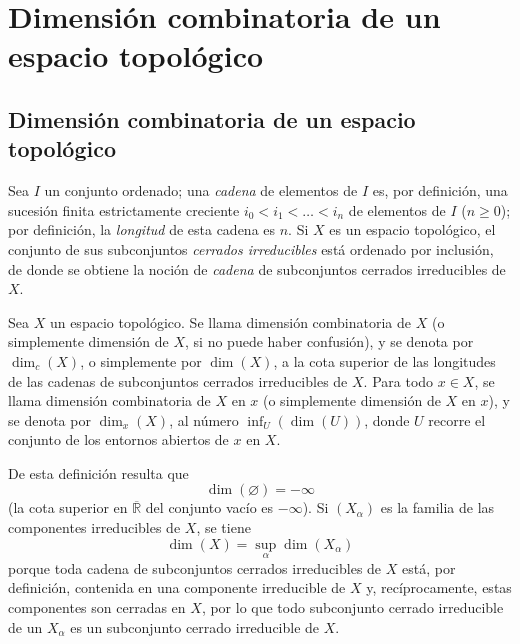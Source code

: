 \setcounter{section}{13}
\section{Dimensión combinatoria de un espacio topológico}
\label{section:0.14-es}

\setcounter{subsection}{0}
\subsection{Dimensión combinatoria de un espacio topológico}
\label{subsection:0.14.1-es}

\begin{env}[14.1.1]
\label{0.14.1.1-es}
Sea $I$ un conjunto ordenado; una \emph{cadena} de elementos de $I$ es, por
definición, una sucesión finita estrictamente creciente
$i_0<i_1<\ldots<i_n$ de elementos de $I$ ($n\geq 0$); por definición, la
\emph{longitud} de esta cadena es $n$. Si $X$ es un espacio topológico, el
conjunto de sus subconjuntos \emph{cerrados irreducibles} está ordenado por
inclusión, de donde se obtiene la noción de \emph{cadena} de subconjuntos
cerrados irreducibles de $X$.
\end{env}

\begin{definition}[14.1.2]
\label{0.14.1.2-es}
Sea $X$ un espacio topológico. Se llama dimensión combinatoria de $X$
\textup{(o simplemente} dimensión de $X$, \textup{si no puede haber confusión)}, y se
denota por $\dim_c(X)$, o simplemente por $\dim(X)$, a la cota superior de las
longitudes de las cadenas de subconjuntos cerrados irreducibles de $X$. Para
todo $x\in X$, se llama dimensión combinatoria de $X$ en $x$ \textup{(o
simplemente} dimensión de $X$ en $x$), y se denota por $\dim_x(X)$, al
número $\inf_U(\dim(U))$, donde $U$ recorre el conjunto de los entornos
abiertos de $x$ en $X$.
\end{definition}

De esta definición resulta que
\[
  \dim(\varnothing)=-\infty
\]
(la cota superior en $\overline{\mathbb R}$ del conjunto vacío es $-\infty$).
Si $(X_\alpha)$ es la familia de las componentes irreducibles de $X$, se tiene
\[
  \dim(X)=\sup_\alpha\dim(X_\alpha)
  \tag{14.1.2.1}\label{0.14.1.2.1-es}
\]
porque toda cadena de subconjuntos cerrados irreducibles de $X$ está, por
definición, contenida en una componente irreducible de $X$ y, recíprocamente,
estas componentes son cerradas en $X$, por lo que todo subconjunto cerrado
irreducible de un $X_\alpha$ es un subconjunto cerrado irreducible de $X$.


